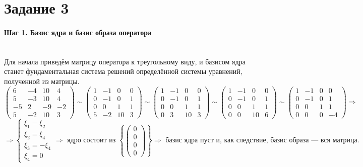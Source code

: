 \documentclass{article}
\begin{document}
\section*{Задание 3}
\paragraph*{Шаг 1. Базис ядра и базис образа оператора} \, \\
Для начала приведём матрицу оператора к треугольному виду, и базисом ядра станет фундаментальная система решений определённой системы уравнений, полученной из матрицы.
$$\begin{pmatrix}
6 & -4 & 10 & 4 \\
5 & -3 & 10 & 4 \\
-5 & 2 & -9 & -2 \\
5 & -2 & 10 & 3
\end{pmatrix} \sim \begin{pmatrix}
1 & -1 & 0 & 0 \\
0 & -1 & 0 & 1 \\
0 & 0 & 1 & 1 \\
5 & -2 & 10 & 3
\end{pmatrix} \sim \begin{pmatrix}
1 & -1 & 0 & 0 \\
0 & -1 & 0 & 1 \\
0 & 0 & 1 & 1 \\
0 & 3 & 10 & 3
\end{pmatrix} \sim \begin{pmatrix}
1 & -1 & 0 & 0 \\
0 & -1 & 0 & 1 \\
0 & 0 & 1 & 1 \\
0 & 0 & 10 & 6
\end{pmatrix} \sim \begin{pmatrix}
1 & -1 & 0 & 0 \\
0 & -1 & 0 & 1 \\
0 & 0 & 1 & 1 \\
0 & 0 & 0 & -4
\end{pmatrix} \Rightarrow $$
$$\Rightarrow \begin{cases}
\xi_1=\xi_2 \\
\xi_2=\xi_4 \\
\xi_3=-\xi_4 \\
\xi_4 = 0
\end{cases} \Rightarrow \text{ ядро состоит из } \left\{\begin{pmatrix}
0 \\ 0 \\ 0 \\ 0
\end{pmatrix}\right\} \Rightarrow \text{ базис ядра пуст и, как следствие, базис образа --- вся матрица.}$$
\end{document}
